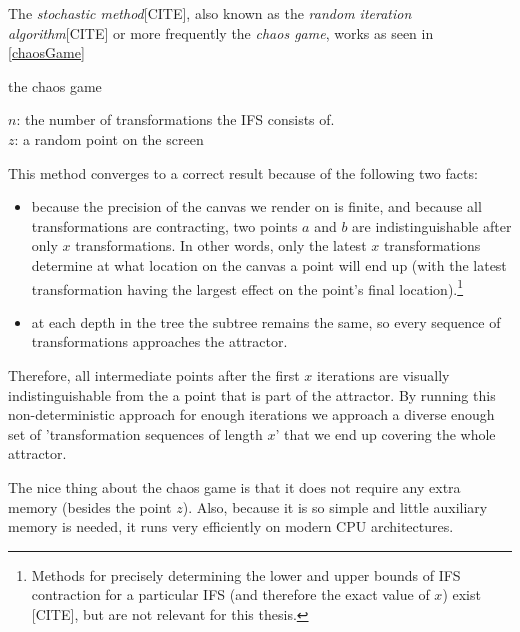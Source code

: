 \documentclass[11pt]{article}
\begin{document}
The \emph{stochastic method}[CITE], also known as the \emph{random iteration algorithm}[CITE] or more frequently the \emph{chaos game}, works as seen in \autoref{chaosGame}

\begin{algorithm}[H]
\caption{the chaos game}
\label{chaosGame}
  $n$: the number of transformations the IFS consists of. \\
  $z$: a random point on the screen  \\

\end{algorithm}

This method converges to a correct result because of the following two facts:

\begin{itemize}
\item because the precision of the canvas we render on is finite, and because all transformations are contracting,
two points \(a\) and \(b\) are indistinguishable after only \(x\) transformations.
 In other words, only the latest \(x\) transformations determine at what location on the canvas a point will end up (with the latest transformation having the largest effect on the point's final location).\footnote{Methods for precisely determining the lower and upper bounds of IFS contraction for a particular IFS (and therefore the exact value of \(x\)) exist [CITE], 
but are not relevant for this thesis.}
\item at each depth in the tree the subtree remains the same, so every sequence of transformations approaches the attractor.
\end{itemize}

Therefore, all intermediate points after the first \(x\) iterations are visually indistinguishable from the a point that is part of the attractor.
By running this non-deterministic approach for enough iterations we approach a diverse enough set of 'transformation sequences of length \(x\)' that we end up covering the whole attractor.

The nice thing about the chaos game is that it does not require any extra memory (besides the point \(z\)).
Also, because it is so simple and little auxiliary memory is needed, it runs very efficiently on modern CPU architectures.
\end{document}
